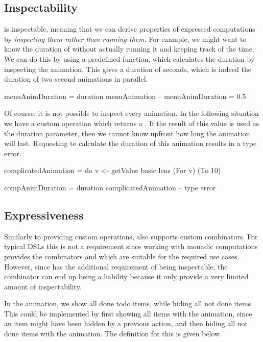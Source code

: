 \subsection{Inspectability}

\dsl{} is inspectable, meaning that we can derive properties of expressed computations by \emph{inspecting them rather than running them}. For example, we might want to know the duration of  without actually running it and keeping track of the time. We can do this by using a predefined  function, which calculates the duration by inspecting the animation. This gives a duration of  seconds, which is indeed the duration of two  second animations in parallel.

\begin{spec}
menuAnimDuration = duration menuAnimation
-- menuAnimDuration = 0.5 
\end{spec}

Of course, it is not possible to inspect every animation. In the following situation we have a custom operation  which returns a . If the result of this value is used as the duration parameter, then we cannot know upfront how long the animation will last. Requesting to calculate the duration of this animation results in a type error.

\begin{spec}
complicatedAnimation = do
  v <- getValue
  basic lens (For v) (To 10)

compAnimDuration = duration complicatedAnimation
-- type error
\end{spec}

\subsection{Expressiveness}
\label{sec:customcomb}

Similarly to providing custom operations, \dsl{} also supports custom combinators. For typical DSLs this is not a requirement since working with monadic computations provides the combinators \hs{>>=} and  which are suitable for the required use cases. However, since \dsl{} has the additional requirement of being inspectable, the \hs{>>=} combinator can end up being a liability because it only provide a very limited amount of inspectability.

In the  animation, we show all done todo items, while hiding all not done items. This could be implemented by first showing all items with the  animation, since an item might have been hidden by a previous action, and then hiding all not done items with the  animation. The definition for this is given below.

